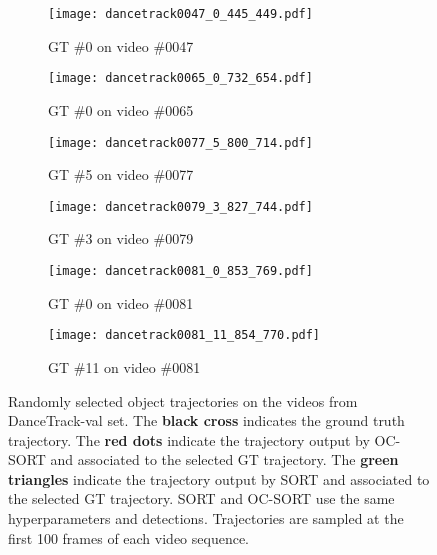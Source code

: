 \documentclass[10pt,twocolumn,letterpaper]{article}
\begin{document}
\begin{figure*}[t]
  \medskip
  \begin{subfigure}[t]{.31\textwidth}
    \centering
    \texttt{[image: dancetrack0047\_0\_445\_449.pdf]}
    \caption{GT  \#0 on video \#0047}
  \end{subfigure}
  \hfill
  \begin{subfigure}[t]{.31\textwidth}
    \centering
    \texttt{[image: dancetrack0065\_0\_732\_654.pdf]}
    \caption{GT  \#0 on video \#0065}
  \end{subfigure}
  \hfill
  \begin{subfigure}[t]{.31\textwidth}
    \centering
    \texttt{[image: dancetrack0077\_5\_800\_714.pdf]}
    \caption{GT  \#5 on video \#0077}
  \end{subfigure}
  

  
  \medskip
  \begin{subfigure}[t]{.31\textwidth}
    \centering
    \texttt{[image: dancetrack0079\_3\_827\_744.pdf]}
    \caption{GT  \#3 on video \#0079}
  \end{subfigure}
    \hfill 
  \begin{subfigure}[t]{.31\textwidth}
    \centering
    \texttt{[image: dancetrack0081\_0\_853\_769.pdf]}
    \caption{GT  \#0 on video \#0081}
  \end{subfigure}
  \hfill
  \begin{subfigure}[t]{.31\textwidth}
    \centering
    \texttt{[image: dancetrack0081\_11\_854\_770.pdf]}
    \caption{GT  \#11 on video \#0081}
  \end{subfigure}

    
  \caption{Randomly selected object trajectories on the videos from DanceTrack-val set. The \textbf{black cross} indicates the ground truth trajectory. The \textbf{{\color{red} red dots}} indicate the trajectory output by OC-SORT and associated to the selected GT trajectory. The \textbf{{\color{cadmiumgreen} green triangles}} indicate the trajectory output by SORT and associated to the selected GT trajectory. SORT and OC-SORT use the same hyperparameters and detections. Trajectories are sampled at the first 100 frames of each video sequence.}
  \label{fig:dancetrack_trajs_full}
\end{figure*}
\end{document}
